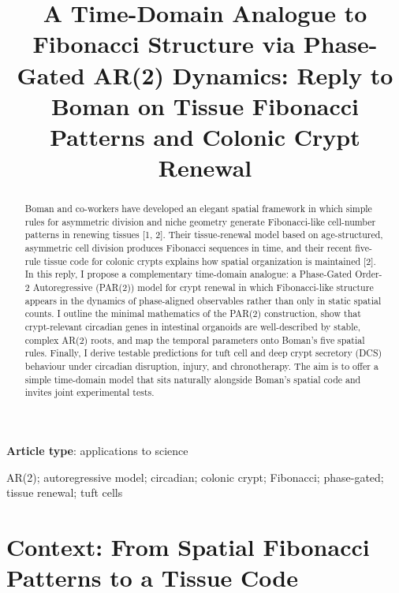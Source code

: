 \documentclass[]{interact}
\makeatletter
\newcommand{\monthyear}[1]{\def\@monthyear{\uppercase{#1}}}
\newcommand{\volnumber}[1]{\def\@volnumber{\uppercase{#1}}}
\makeatother
\begin{document}
\monthyear{[Month Year]}
\volnumber{[Volume, Number]}
\setcounter{page}{1}

\title{A Time-Domain Analogue to Fibonacci Structure via Phase-Gated AR(2) Dynamics:
Reply to Boman on Tissue Fibonacci Patterns and Colonic Crypt Renewal}

\author{
}

\maketitle

{\bf Article type}: applications to science

\bigskip

\begin{abstract}
Boman and co-workers have developed an elegant spatial framework in which simple
rules for asymmetric division and niche geometry generate Fibonacci-like
cell-number patterns in renewing tissues [1, 2].
Their tissue-renewal model based on age-structured, asymmetric cell division
produces Fibonacci sequences in time, and their recent five-rule tissue code
for colonic crypts explains how spatial organization is maintained [2].
In this reply, I propose a complementary time-domain analogue: a Phase-Gated
Order-2 Autoregressive (PAR(2)) model for crypt renewal in which Fibonacci-like
structure appears in the dynamics of phase-aligned observables rather than only
in static spatial counts.
I outline the minimal mathematics of the PAR(2) construction, show that
crypt-relevant circadian genes in intestinal organoids are well-described by
stable, complex AR(2) roots, and map the temporal parameters onto Boman's
five spatial rules.
Finally, I derive testable predictions for tuft cell and deep crypt secretory
(DCS) behaviour under circadian disruption, injury, and chronotherapy.
The aim is to offer a simple time-domain model that sits naturally alongside
Boman's spatial code and invites joint experimental tests.
\end{abstract}

\begin{keywords}
AR(2); autoregressive model; circadian; colonic crypt; Fibonacci; phase-gated; tissue renewal; tuft cells
\end{keywords}

\section{Context: From Spatial Fibonacci Patterns to a Tissue Code}
\end{document}
